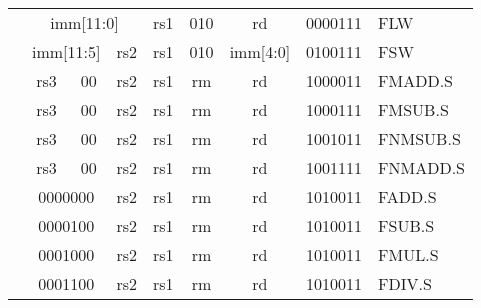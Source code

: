 \begin{table}[p]
\begin{small}
\begin{center}
\begin{tabular}{p{0in}p{0.4in}p{0.05in}p{0.05in}p{0.05in}p{0.05in}p{0.4in}p{0.6in}p{0.4in}p{0.6in}p{0.7in}l}
&
\multicolumn{6}{|c|}{imm[11:0]} &
\multicolumn{1}{c|}{rs1} &
\multicolumn{1}{c|}{010} &
\multicolumn{1}{c|}{rd} &
\multicolumn{1}{c|}{0000111} & FLW \\
\cline{2-11}
  

&
\multicolumn{4}{|c|}{imm[11:5]} &
\multicolumn{2}{c|}{rs2} &
\multicolumn{1}{c|}{rs1} &
\multicolumn{1}{c|}{010} &
\multicolumn{1}{c|}{imm[4:0]} &
\multicolumn{1}{c|}{0100111} & FSW \\
\cline{2-11}
  

&
\multicolumn{2}{|c|}{rs3} &
\multicolumn{2}{c|}{00} &
\multicolumn{2}{c|}{rs2} &
\multicolumn{1}{c|}{rs1} &
\multicolumn{1}{c|}{rm} &
\multicolumn{1}{c|}{rd} &
\multicolumn{1}{c|}{1000011} & FMADD.S \\
\cline{2-11}
  

&
\multicolumn{2}{|c|}{rs3} &
\multicolumn{2}{c|}{00} &
\multicolumn{2}{c|}{rs2} &
\multicolumn{1}{c|}{rs1} &
\multicolumn{1}{c|}{rm} &
\multicolumn{1}{c|}{rd} &
\multicolumn{1}{c|}{1000111} & FMSUB.S \\
\cline{2-11}
  

&
\multicolumn{2}{|c|}{rs3} &
\multicolumn{2}{c|}{00} &
\multicolumn{2}{c|}{rs2} &
\multicolumn{1}{c|}{rs1} &
\multicolumn{1}{c|}{rm} &
\multicolumn{1}{c|}{rd} &
\multicolumn{1}{c|}{1001011} & FNMSUB.S \\
\cline{2-11}
  

&
\multicolumn{2}{|c|}{rs3} &
\multicolumn{2}{c|}{00} &
\multicolumn{2}{c|}{rs2} &
\multicolumn{1}{c|}{rs1} &
\multicolumn{1}{c|}{rm} &
\multicolumn{1}{c|}{rd} &
\multicolumn{1}{c|}{1001111} & FNMADD.S \\
\cline{2-11}
  

&
\multicolumn{4}{|c|}{0000000} &
\multicolumn{2}{c|}{rs2} &
\multicolumn{1}{c|}{rs1} &
\multicolumn{1}{c|}{rm} &
\multicolumn{1}{c|}{rd} &
\multicolumn{1}{c|}{1010011} & FADD.S \\
\cline{2-11}
  

&
\multicolumn{4}{|c|}{0000100} &
\multicolumn{2}{c|}{rs2} &
\multicolumn{1}{c|}{rs1} &
\multicolumn{1}{c|}{rm} &
\multicolumn{1}{c|}{rd} &
\multicolumn{1}{c|}{1010011} & FSUB.S \\
\cline{2-11}
  

&
\multicolumn{4}{|c|}{0001000} &
\multicolumn{2}{c|}{rs2} &
\multicolumn{1}{c|}{rs1} &
\multicolumn{1}{c|}{rm} &
\multicolumn{1}{c|}{rd} &
\multicolumn{1}{c|}{1010011} & FMUL.S \\
\cline{2-11}
  

&
\multicolumn{4}{|c|}{0001100} &
\multicolumn{2}{c|}{rs2} &
\multicolumn{1}{c|}{rs1} &
\multicolumn{1}{c|}{rm} &
\multicolumn{1}{c|}{rd} &
\multicolumn{1}{c|}{1010011} & FDIV.S \\
\cline{2-11}
  


\end{tabular}
\end{center}
\end{small}
\end{table}
